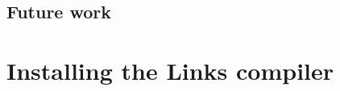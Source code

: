 \documentclass[mscres,cdtppar,twoside,openright,logo,rightchapter,normalheadings]{infthesis}
\theoremstyle{definition}
\begin{document}
\section{Future work}
\label{sec:futurework}


%

\nocite{*}
\singlespace



\appendix
\chapter{Installing the Links compiler}
\label{ch:install}

\end{document}
